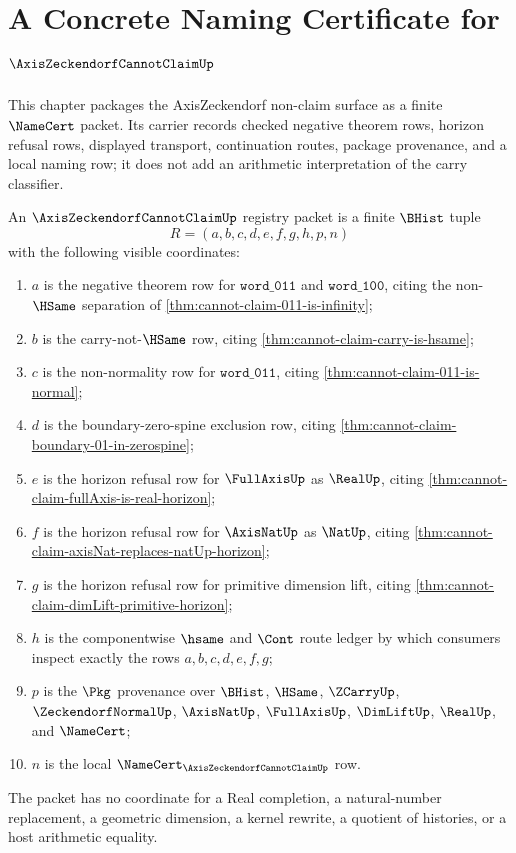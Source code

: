\chapter{A Concrete Naming Certificate for $\AxisZeckendorfCannotClaimUp$}
\label{ch:concrete-instances-axiszeckendorfcannotclaim-namecert}

This chapter packages the AxisZeckendorf non-claim surface as a finite $\NameCert$ packet. Its carrier records checked negative theorem rows, horizon refusal rows, displayed transport, continuation routes, package provenance, and a local naming row; it does not add an arithmetic interpretation of the carry classifier.

\begin{definition}
\label{def:axis-zeckendorf-cannot-claim-registry-packet}
An $\AxisZeckendorfCannotClaimUp$ registry packet is a finite $\BHist$ tuple
$$
R=(a,b,c,d,e,f,g,h,p,n)
$$
with the following visible coordinates:
\begin{enumerate}
\item $a$ is the negative theorem row for $\mathtt{word\_011}$ and $\mathtt{word\_100}$, citing the non-$\HSame$ separation of \autoref{thm:cannot-claim-011-is-infinity};
\item $b$ is the carry-not-$\HSame$ row, citing \autoref{thm:cannot-claim-carry-is-hsame};
\item $c$ is the non-normality row for $\mathtt{word\_011}$, citing \autoref{thm:cannot-claim-011-is-normal};
\item $d$ is the boundary-zero-spine exclusion row, citing \autoref{thm:cannot-claim-boundary-01-in-zerospine};
\item $e$ is the horizon refusal row for $\FullAxisUp$ as $\RealUp$, citing \autoref{thm:cannot-claim-fullAxis-is-real-horizon};
\item $f$ is the horizon refusal row for $\AxisNatUp$ as $\NatUp$, citing \autoref{thm:cannot-claim-axisNat-replaces-natUp-horizon};
\item $g$ is the horizon refusal row for primitive dimension lift, citing \autoref{thm:cannot-claim-dimLift-primitive-horizon};
\item $h$ is the componentwise $\hsame$ and $\Cont$ route ledger by which consumers inspect exactly the rows $a,b,c,d,e,f,g$;
\item $p$ is the $\Pkg$ provenance over $\BHist$, $\HSame$, $\ZCarryUp$, $\ZeckendorfNormalUp$, $\AxisNatUp$, $\FullAxisUp$, $\DimLiftUp$, $\RealUp$, and $\NameCert$;
\item $n$ is the local $\NameCert_{\AxisZeckendorfCannotClaimUp}$ row.
\end{enumerate}
The packet has no coordinate for a Real completion, a natural-number replacement, a geometric dimension, a kernel rewrite, a quotient of histories, or a host arithmetic equality.
\end{definition}

